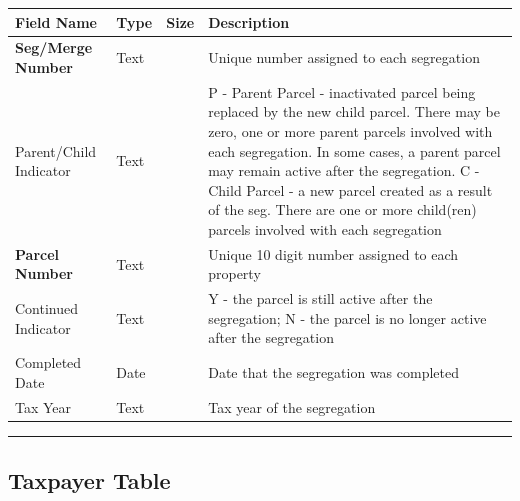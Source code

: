 \documentclass[
  english,
  letterpaper,
  DIV=11,
  numbers=noendperiod]{scrreprt}
\newcounter{none} %
\begin{document}
{\def\LTcaptype{none} %
\begin{longtable}[]{@{}
  >{\raggedright\arraybackslash}p{}
  >{\raggedright\arraybackslash}p{}
  >{\raggedright\arraybackslash}p{}
  >{\raggedright\arraybackslash}p{}@{}}
\toprule\noalign{}
\begin{minipage}[b]{\linewidth}\raggedright
Field Name
\end{minipage} & \begin{minipage}[b]{\linewidth}\raggedright
Type
\end{minipage} & \begin{minipage}[b]{\linewidth}\raggedright
Size
\end{minipage} & \begin{minipage}[b]{\linewidth}\raggedright
Description
\end{minipage} \\
\midrule\noalign{}
\endhead
\bottomrule\noalign{}
\endlastfoot
\textbf{Seg/Merge Number} & Text & 12 & Unique number assigned to each
segregation \\
Parent/Child Indicator & Text & 1 & P - Parent Parcel - inactivated
parcel being replaced by the new child parcel. There may be zero, one or
more parent parcels involved with each segregation. In some cases, a
parent parcel may remain active after the segregation. C - Child Parcel
- a new parcel created as a result of the seg. There are one or more
child(ren) parcels involved with each segregation \\
\textbf{Parcel Number} & Text & 10 & Unique 10 digit number assigned to
each property \\
Continued Indicator & Text & 1 & Y - the parcel is still active after
the segregation; N - the parcel is no longer active after the
segregation \\
Completed Date & Date & & Date that the segregation was completed \\
Tax Year & Text & 4 & Tax year of the segregation \\
\end{longtable}
}

\begin{center}\rule{0.5\linewidth}{0.5pt}\end{center}

\subsection{Taxpayer Table}\label{taxpayer-table}
\end{document}
